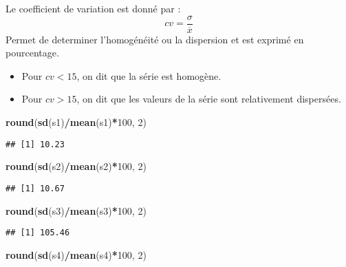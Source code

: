 \documentclass[
]{book}
\newenvironment{Shaded}{\begin{snugshade}}{\end{snugshade}}
\newcommand{\DecValTok}[1]{\textcolor[rgb]{0.00,0.00,0.81}{#1}}
\newcommand{\FunctionTok}[1]{\textcolor[rgb]{0.13,0.29,0.53}{\textbf{#1}}}
\newcommand{\NormalTok}[1]{#1}
\newcommand{\SpecialCharTok}[1]{\textcolor[rgb]{0.81,0.36,0.00}{\textbf{#1}}}
\providecommand{\tightlist}{%
  \setlength{\itemsep}{0pt}\setlength{\parskip}{0pt}}
\theoremstyle{definition}
\theoremstyle{definition}
\theoremstyle{definition}
\theoremstyle{definition}
\theoremstyle{remark}
\begin{document}
Le coefficient de variation est donné par :
\[cv = \frac{\sigma}{\overline{x}}\]
Permet de determiner l'homogénéité ou la dispersion et est exprimé en pourcentage.

\begin{itemize}
\tightlist
\item
  Pour \(cv<15%
  \), on dit que la série est homogène.
\item
  Pour \(cv>15%
  \), on dit que les valeurs de la série sont relativement dispersées.
\end{itemize}

\begin{Shaded}
\begin{Highlighting}[]
\FunctionTok{round}\NormalTok{(}\FunctionTok{sd}\NormalTok{(s1)}\SpecialCharTok{/}\FunctionTok{mean}\NormalTok{(s1)}\SpecialCharTok{*}\DecValTok{100}\NormalTok{, }\DecValTok{2}\NormalTok{)}
\end{Highlighting}
\end{Shaded}

\begin{verbatim}
## [1] 10.23
\end{verbatim}

\begin{Shaded}
\begin{Highlighting}[]
\FunctionTok{round}\NormalTok{(}\FunctionTok{sd}\NormalTok{(s2)}\SpecialCharTok{/}\FunctionTok{mean}\NormalTok{(s2)}\SpecialCharTok{*}\DecValTok{100}\NormalTok{, }\DecValTok{2}\NormalTok{)}
\end{Highlighting}
\end{Shaded}

\begin{verbatim}
## [1] 10.67
\end{verbatim}

\begin{Shaded}
\begin{Highlighting}[]
\FunctionTok{round}\NormalTok{(}\FunctionTok{sd}\NormalTok{(s3)}\SpecialCharTok{/}\FunctionTok{mean}\NormalTok{(s3)}\SpecialCharTok{*}\DecValTok{100}\NormalTok{, }\DecValTok{2}\NormalTok{)}
\end{Highlighting}
\end{Shaded}

\begin{verbatim}
## [1] 105.46
\end{verbatim}

\begin{Shaded}
\begin{Highlighting}[]
\FunctionTok{round}\NormalTok{(}\FunctionTok{sd}\NormalTok{(s4)}\SpecialCharTok{/}\FunctionTok{mean}\NormalTok{(s4)}\SpecialCharTok{*}\DecValTok{100}\NormalTok{, }\DecValTok{2}\NormalTok{)}
\end{Highlighting}
\end{Shaded}
\end{document}
